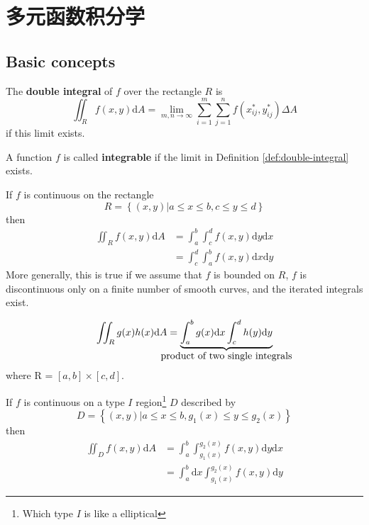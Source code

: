 \chapter{多元函数积分学}

\section{Basic concepts}

\begin{definition}
    \label{def:double-integral}
    The \textbf{double integral} of $f$ over the rectangle $R$ is
    \[
        \iint_{R} f(x, y) \mathrm{d}A = \lim_{m, n \to \infty} \sum_{i = 1}^{m}\sum_{j = 1}^{n} f(x^*_{ij}, y^*_{ij}) \Delta A
    \]
    if this limit exists.
\end{definition}
A function $f$ is called \textbf{integrable} if the limit in Definition \ref{def:double-integral} exists.

\begin{theorem}
    If $f$ is continuous on the rectangle
    \[
        R = \left\{(x, y) | a \leq x \leq b, c \leq y \leq d\right\}
    \]
    then
    \begin{align*}
        \iint_{R} f(x, y) \mathrm{d}A &= \int_a^b \int_c^d f(x, y) \mathrm{d}y \mathrm{d}x \\
                                      &= \int_c^d \int_a^b f(x, y) \mathrm{d}x \mathrm{d}y
    \end{align*}
    More generally, this is true 
    if we assume that $f$ is bounded on $R$, $f$ is discontinuous only 
    on a finite number of smooth curves, and the iterated integrals exist.
\end{theorem}

\begin{corollary}
    \[
        \iint_R g(x) h(x) \mathrm dA = 
        \underbrace{
            \int_a^b g(x) \mathrm dx \int_c^d h(y) \mathrm dy    
        }_{\mathclap{\mbox{product of two single integrals}}}
    \]
    where R = $[a, b] \times [c, d]$.
\end{corollary}

\begin{corollary}
    If $f$ is continuous on a type $I$ region\footnote{Which type $I$ is like a elliptical} 
    $D$ described by
    \[
        D = \left\{(x, y) | a \leq x \leq b, g_1(x) \leq y \leq g_2(x) \right\}
    \]
    then
    \begin{align*}
        \iint_D f(x,y) \mathrm dA &= \int_a^b \int_{g_1(x)}^{g_2(x)} f(x, y) \mathrm dy \mathrm dx \\
                                  &= \int_a^b \mathrm dx \int_{g_1(x)}^{g_2(x)} f(x, y) \mathrm dy
    \end{align*}
\end{corollary}

